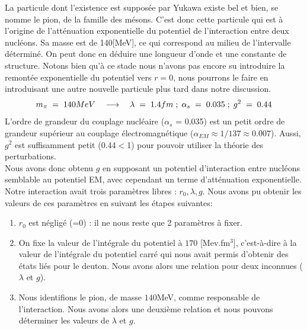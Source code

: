 La particule dont l'existence est supposée par Yukawa existe bel et bien, se nomme le pion, de la famille des mésons. C'est donc cette particule qui est à l'origine de l'atténuation exponentielle du potentiel de l'interaction entre deux nucléons. Sa masse est de 140[MeV], ce qui correspond au milieu de l'intervalle déterminé. On peut donc en déduire une longueur d'onde et une constante de structure. Notons bien qu'à ce stade nous n'avons pas encore su introduire la remontée exponentielle du potentiel vers $r=0$, nous pourrons le faire en introduisant une autre nouvelle particule plus tard dans notre discussion.
\begin{equation*}
    m_\pi \; = \; 140MeV \quad \longrightarrow \quad \lambda \; = \; 1.4fm\;;\;\alpha_s \; = \; 0.035\;;\; g^2\; = \; 0.44
\end{equation*}
L'ordre de grandeur du couplage nucléaire ($\alpha_s$ = 0.035) est un petit ordre de grandeur supérieur au couplage électromagnétique ($\alpha_{EM} \approx 1/137 \approx 0.007$). Aussi, $g^2$ est suffisamment petit (0.44$<$1) pour pouvoir utiliser la théorie des perturbations.\\

Nous avons donc obtenu $g$ en supposant un potentiel d'interaction entre nucléons semblable au potentiel EM, avec cependant un terme d'atténuation exponentielle. Notre interaction avait trois paramètres libres : $r_0, \lambda, g$. Nous avons pu obtenir les valeurs de ces paramètres en suivant les étapes suivantes:
\begin{enumerate}
    \item $r_0$ est négligé (=0) : il ne nous reste que 2 paramètres à fixer.
    
    \item On fixe la valeur de l'intégrale du potentiel à $170$ [Mev.fm$^3$], c'est-à-dire à la valeur de l'intégrale du potentiel carré qui nous avait permis d'obtenir des états liés pour le deuton. Nous avons alors une relation pour deux inconnues ($\lambda$ et $g$).
    
    \item Nous identifions le pion, de masse $140$MeV, comme responsable de l'interaction. Nous avons alors une deuxième relation et nous pouvons déterminer les valeurs de $\lambda$ et $g$.\\
\end{enumerate}


